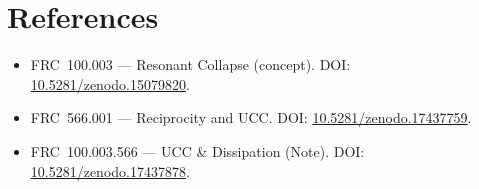 \documentclass[10pt]{article}
\begin{document}
\section*{References}
\small
\begin{itemize}
  \item FRC~100.003 — Resonant Collapse (concept). DOI: \href{https://doi.org/10.5281/zenodo.15079820}{10.5281/zenodo.15079820}.
  \item FRC~566.001 — Reciprocity and UCC. DOI: \href{https://doi.org/10.5281/zenodo.17437759}{10.5281/zenodo.17437759}.
  \item FRC~100.003.566 — UCC \& Dissipation (Note). DOI: \href{https://doi.org/10.5281/zenodo.17437878}{10.5281/zenodo.17437878}.
\end{itemize}
\end{document}
